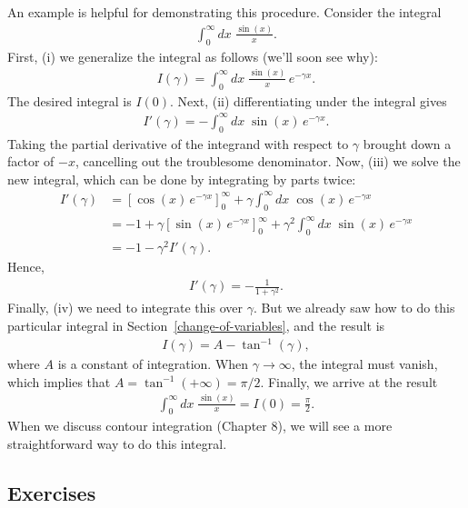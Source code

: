 \documentclass[10pt,a4paper]{article}
\begin{document}
An example is helpful for demonstrating this procedure.  Consider the integral
\begin{align}
  \int_{0}^\infty dx \; \frac{\sin(x)}{x}.
\end{align}
First, (i) we generalize the integral as follows (we'll soon see why):
\begin{align}
  I(\gamma) = \int_{0}^\infty dx \; \frac{\sin(x)}{x}\, e^{-\gamma x}.
\end{align}
The desired integral is $I(0)$.  Next, (ii) differentiating under the
integral gives
\begin{align}
  I'(\gamma) = - \int_{0}^\infty dx \; \sin(x)\, e^{-\gamma x}.
\end{align}
Taking the partial derivative of the integrand with respect to
$\gamma$ brought down a factor of $-x$, cancelling out the troublesome
denominator.  Now, (iii) we solve the new integral, which can be done
by integrating by parts twice:
\begin{align}
  I'(\gamma) &= \left[\cos(x)\,e^{-\gamma x}\right]_0^\infty + \gamma \int_{0}^\infty dx \; \cos(x)\, e^{-\gamma x} \\
  &= -1 + \gamma \left[\sin(x)\,e^{-\gamma x}\right]_0^\infty + \gamma^2 \int_{0}^\infty dx \; \sin(x)\, e^{-\gamma x} \\
  &= -1 - \gamma^2 I'(\gamma).
\end{align}
Hence,
\begin{align}
  I'(\gamma) = - \frac{1}{1+\gamma^2}.
\end{align}
Finally, (iv) we need to integrate this over $\gamma$. But we already
saw how to do this particular integral in
Section~\ref{change-of-variables}, and the result is
\begin{align}
  I(\gamma) = A - \tan^{-1}(\gamma),
\end{align}
where $A$ is a constant of integration. When $\gamma \rightarrow
\infty$, the integral must vanish, which implies that $A =
\tan^{-1}(+\infty) = \pi/2$.  Finally, we arrive at the result
\begin{align}
  \int_{0}^\infty dx \; \frac{\sin(x)}{x} = I(0) = \frac{\pi}{2}.
\end{align}
When we discuss contour integration (Chapter 8), we will see a more
straightforward way to do this integral.

\subsection{Exercises}
\label{exercises}
\end{document}
